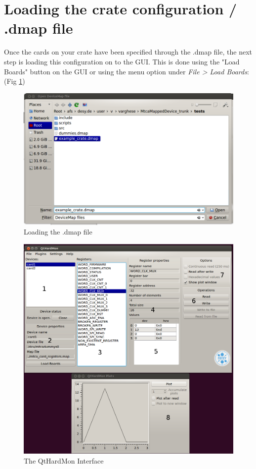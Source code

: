 \section{Loading the crate configuration / .dmap file}
Once the cards on your crate have been specified through the .dmap file, the next step is loading this configuration on to the GUI. This is done using the "Load Boards" button on the GUI or using the menu option under \textit{File > Load Boards}: (Fig \ref{load_boards_open_menu_to_load_dmap})

\begin{figure}[htbp]
\centering
\includegraphics[width=1\textwidth]{images/load_boards_2.png}
 \caption{Loading the .dmap file}
\label{load_boards_open_menu_to_load_dmap}
\end{figure}

\begin{figure}[htbp]
\centering
\includegraphics[width=1\textwidth]{images/explain_windows.png}
 \caption{The QtHardMon Interface}
\label{qthardmon_interface}
\end{figure}

